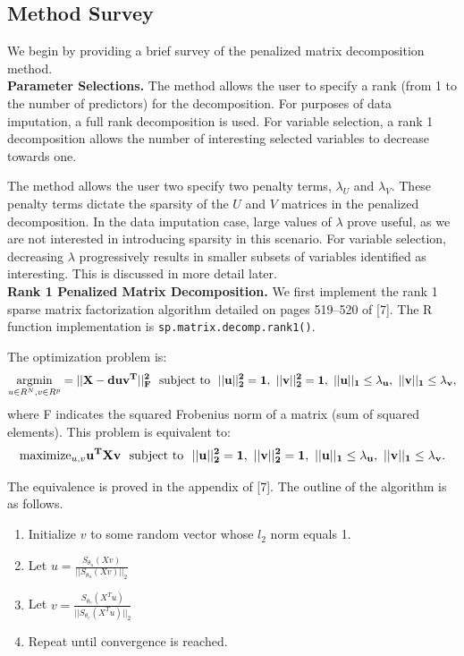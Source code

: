 \documentclass{article}
\newcommand{\myindent}{\hspace*{1cm}}
\DeclareMathOperator*{\argmin}{argmin}
\begin{document}
\subsection{Method Survey}

We begin by providing a brief survey of the penalized matrix decomposition method.\\

\textbf{Parameter Selections.} The method allows the user to specify a rank (from 1 to the number of predictors) for the decomposition.  For purposes of data imputation, a full rank decomposition is used.  For variable selection, a rank 1 decomposition allows the number of interesting selected variables to decrease towards one.

The method allows the user two specify two penalty terms, $\lambda_U$ and $\lambda_V$.  These penalty terms dictate the sparsity of the $U$ and $V$ matrices in the penalized decomposition.  In the data imputation case, large values of $\lambda$ prove useful, as we are not interested in introducing sparsity in this scenario.  For variable selection, decreasing $\lambda$ progressively results in smaller subsets of variables identified as interesting.  This is discussed in more detail later.\\

\textbf{Rank 1 Penalized Matrix Decomposition.} We first implement the rank 1 sparse matrix factorization algorithm detailed on pages 519--520 of [7]. The R function implementation is {\tt sp.matrix.decomp.rank1()}.

The optimization problem is:
%
%
$$\argmin\limits_{u \in R^N, v \in R^p} = ||\bf{X} - d\bf{uv}^T||_F^2 \mskip12mu\hbox{subject to}\mskip12mu ||u||_2^2 = 1,\ ||v||_2^2 = 1,\ ||u||_1 \leq \lambda_u,\ ||v||_1 \leq \lambda_v,$$
%
where F indicates the squared Frobenius norm of a matrix (sum of squared elements).  This problem is equivalent to:
$$\text{maximize}_{u,v}\bf{ u^TXv}\mskip12mu\hbox{subject to}\mskip12mu ||u||_2^2 = 1,\ ||v||_2^2 = 1,\ ||u||_1 \leq \lambda_u,\ ||v||_1 \leq \lambda_v.$$

The equivalence is proved in the appendix of [7].  The outline of the algorithm is as follows.

\begin{enumerate}
	\item Initialize $v$ to some random vector whose $l_2$ norm equals 1.
	\item Let $u = \frac{S_{\theta_u}(Xv)} {||S_{\theta_u}(Xv)||_2}$
	\item Let $v = \frac{S_{\theta_v}(X^T u)} {||S_{\theta_v}(X^T u)||_2}$
	\item Repeat until convergence is reached.
\end{enumerate}
\end{document}
